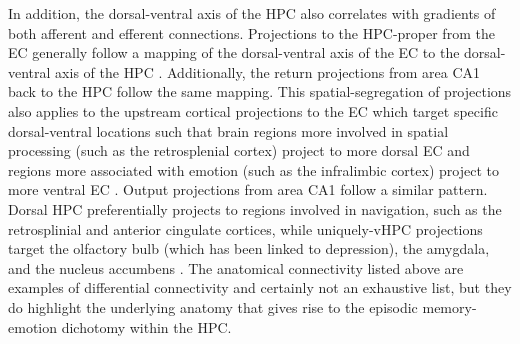 In addition, the dorsal-ventral axis of the \ac{HPC} also correlates with gradients of both afferent and efferent connections.
Projections to the \ac{HPC}-proper from the \ac{EC} generally follow a mapping of the dorsal-ventral axis of the \ac{EC} to the dorsal-ventral axis of the \ac{HPC} \citep{Strange2014}.
Additionally, the return projections from area CA1 back to the \ac{HPC} follow the same mapping.
This spatial-segregation of projections also applies to the upstream cortical projections to the \ac{EC} which target specific dorsal-ventral locations such that brain regions more involved in spatial processing (such as the retrosplenial cortex) project to more dorsal \ac{EC} and regions more associated with emotion (such as the infralimbic cortex) project to more ventral \ac{EC} \citep{Strange2014}.
Output projections from area CA1 follow a similar pattern.
Dorsal \ac{HPC} preferentially projects to regions involved in navigation, such as the retrosplinial and anterior cingulate cortices, while uniquely-\ac{vHPC} projections target the olfactory bulb (which has been linked to depression), the amygdala, and the nucleus accumbens \citep{Moser1998, Fanselow2010, Strange2014}.
The anatomical connectivity listed above are examples of differential connectivity and certainly not an exhaustive list, but they do highlight the underlying anatomy that gives rise to the episodic memory-emotion dichotomy within the \ac{HPC}.

